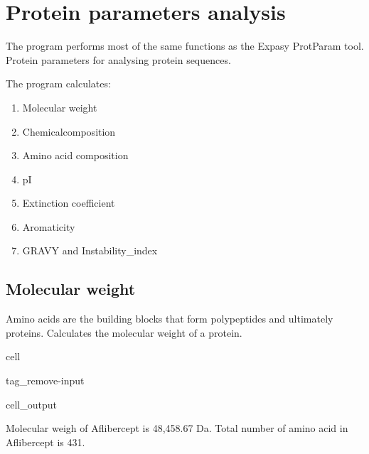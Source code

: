 \documentclass[letterpaper,10pt,english]{jupyterBook}
\begin{document}
\chapter{Protein parameters analysis}
\label{\detokenize{ipynb/chapter1:protein-parameters-analysis}}\label{\detokenize{ipynb/chapter1::doc}}
\sphinxAtStartPar
The program performs most of the same functions as the Expasy ProtParam tool.
Protein parameters for analysing protein sequences.

\sphinxAtStartPar
The program calculates:
\begin{enumerate}
%
\item {} 
\sphinxAtStartPar
Molecular weight

\item {} 
\sphinxAtStartPar
Chemicalcomposition

\item {} 
\sphinxAtStartPar
Amino acid composition

\item {} 
\sphinxAtStartPar
pI

\item {} 
\sphinxAtStartPar
Extinction coefficient

\item {} 
\sphinxAtStartPar
Aromaticity

\item {} 
\sphinxAtStartPar
GRAVY and Instability\_index

\end{enumerate}


\section{Molecular weight}
\label{\detokenize{ipynb/chapter1:molecular-weight}}
\sphinxAtStartPar
Amino acids are the building blocks that form polypeptides and ultimately proteins. Calculates the molecular weight of a protein.

\begin{sphinxuseclass}{cell}
\begin{sphinxuseclass}{tag_remove-input}\begin{sphinxVerbatimOutput}

\begin{sphinxuseclass}{cell_output}
\begin{sphinxVerbatim}[commandchars=\\\{\}]
Molecular weigh of Aflibercept is 48,458.67 Da.
Total number of amino acid in Aflibercept is 431.
\end{sphinxVerbatim}

\end{sphinxuseclass}\end{sphinxVerbatimOutput}

\end{sphinxuseclass}
\end{sphinxuseclass}
\end{document}
